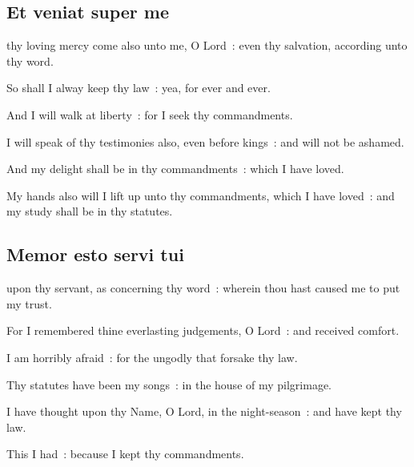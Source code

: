 \subsection{Et veniat super me}


 thy loving mercy come also unto me, O Lord~: even thy salvation, according unto thy word.\par
{}
So shall I alway keep thy law~: yea, for ever and ever.\par
{}And I will walk at liberty~: for I seek thy commandments.\par
{}I will speak of thy testimonies also, even before kings~: and will not be ashamed.\par
{}And my delight shall be in thy commandments~: which I have loved.\par
{}My hands also will I lift up unto thy commandments, which I have loved~: and my study shall be in thy statutes.\par


\clearpage
\subsection{Memor esto servi tui}


 upon thy servant, as concerning thy word~: wherein thou hast caused me to put my trust.\par
{}
For I remembered thine everlasting judgements, O Lord~: and received comfort.\par
{}I am horribly afraid~: for the ungodly that forsake thy law.\par
{}Thy statutes have been my songs~: in the house of my pilgrimage.\par
{}I have thought upon thy Name, O Lord, in the night-season~: and have kept thy law.\par
{}This I had~: because I kept thy commandments.\par

